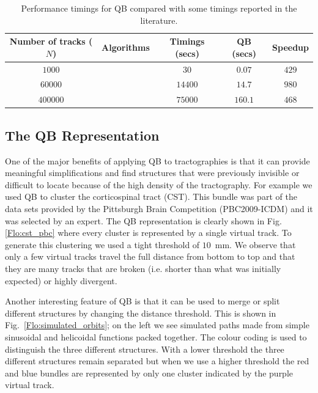 \documentclass{bioinfo}
\begin{document}
%
\begin{table}
\scriptsize\addtolength{\tabcolsep}{-5pt}
\caption{Performance timings for QB compared with some timings
  reported in the literature.\label{Flo:timings}}
\begin{centering}
\begin{tabular}{ccccc}
\hline 
Number of tracks ($N$) & Algorithms & Timings (secs) & QB (secs) & Speedup\tabularnewline
\hline
$1000$ & \citet{wang2010tractography} & $30$ & $0.07$ & $429$\tabularnewline
$\num{60000}$ & \citet{wang2010tractography} & $\num{14400}$ & $14.7$ & $980$\tabularnewline
$\num{400000}$ & \citet{Visser2010} & $\num{75000}$ & $160.1$ & $468$\tabularnewline
\hline
\end{tabular}
\par\end{centering}
\end{table}

\subsection{The QB Representation\label{QB_Representation}}

One of the major benefits of applying QB to tractographies is that it
can provide meaningful simplifications and find structures that were
previously invisible or difficult to locate because of the high density
of the tractography. For example we used QB to cluster the corticospinal
tract (CST). This bundle was part of the data sets provided by the
Pittsburgh Brain Competition (PBC2009-ICDM) and it was selected by an
expert. The QB representation is clearly shown in Fig.\ref{Flo:cst_pbc} where
every cluster is represented by a single virtual track. To generate this
clustering we used a tight threshold of $10$~mm. We observe that only a
few virtual tracks travel the full distance from bottom to top and that
they are many tracks that are broken (i.e. shorter than what was
initially expected) or highly divergent.

Another interesting feature of QB is that it can be used to merge or
split different structures by changing the distance threshold.  This is
shown in Fig.~\ref{Flo:simulated_orbits}; on the left we see simulated
paths made from simple sinusoidal and helicoidal functions packed
together. The colour coding is used to distinguish the three different
structures. With a lower threshold the three different structures remain
separated but when we use a higher threshold the red and blue bundles
are represented by only one cluster indicated by the purple virtual
track.
\end{document}
